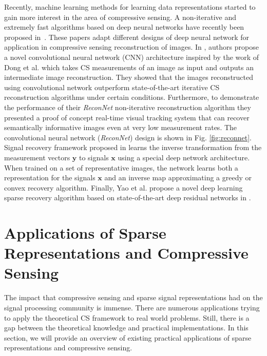 \documentclass[journal]{IEEEtran}
\begin{document}
Recently, machine learning methods for learning data representations started to gain more interest in the area of compressive sensing. A non-iterative and extremely fast algorithms based on deep neural networks have recently been proposed in~\cite{Kulkarni2016, Mousavi2017, Mousavi2015}. These papers adapt different designs of deep neural network for application in compressive sensing reconstruction of images. In \cite{Kulkarni2016}, authors propose a novel convolutional neural network (CNN) architecture inspired by the work of Dong et al. \cite{Dong2016} which takes CS measurements of an image as input and outputs an intermediate image reconstruction. They showed that the images reconstructed using convolutional network outperform state-of-the-art iterative CS reconstruction algorithms under certain conditions. Furthermore, to demonstrate the performance of their \textit{ReconNet} non-iterative reconstruction algorithm they presented a proof of concept real-time visual tracking system that can recover semantically informative images even at very low measurement rates. The convolutional neural network (\textit{ReconNet}) design is shown in Fig. \ref{fig:reconnet}. Signal recovery framework proposed in \cite{Mousavi2017} learns the inverse transformation from the measurement vectors $\boldsymbol{y}$ to signals $\boldsymbol{x}$ using a special deep network architecture. When trained on a set of representative images, the network learns both a representation for the signals $\boldsymbol{x}$ and an inverse map approximating a greedy or convex recovery algorithm. Finally, Yao et al. propose a novel deep learning sparse recovery algorithm based on state-of-the-art deep residual networks in \cite{Yao2017}.

\section{Applications of Sparse Representations and Compressive Sensing} \label{sec:6}

The impact that compressive sensing and sparse signal representations had on the signal processing community is immense. There are numerous applications trying to apply the theoretical CS framework to real world problems. Still, there is a gap between the theoretical knowledge and practical implementations. In this section, we will provide an overview of existing practical applications of sparse representations and compressive sensing.
\end{document}
